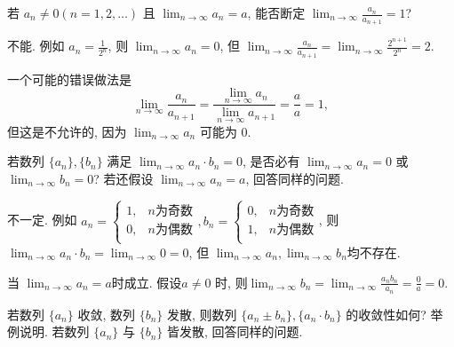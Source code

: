 \begin{exercise}[1.2.9]
    若 $a_n \ne 0 (n=1, 2, \ldots)$ 且 $\lim_{n\to\infty} a_n = a$, 能否断定 $\lim_{n\to\infty} \frac{a_n}{a_{n+1}} = 1$?
\end{exercise}

\begin{solution}
    不能. 例如 $a_n = \frac{1}{2^n}$, 则 $\lim_{n\to\infty} a_n = 0$, 但 $\lim_{n\to\infty} \frac{a_n}{a_{n+1}} = \lim_{n\to\infty} \frac{2^{n+1}}{2^n} = 2$.

    一个可能的错误做法是$$\lim_{n\to\infty} \frac{a_n}{a_{n+1}} = \frac{\lim_{n\to\infty} a_n}{\lim_{n\to\infty} a_{n+1}} = \frac{a}{a} = 1,$$ 但这是不允许的, 因为 $\lim_{n\to\infty} a_n$ 可能为 $0$.
\end{solution}

\begin{exercise}[1.2.10]
    若数列 $\{a_n\}, \{b_n\}$ 满足 $\lim_{n\to\infty} a_n \cdot b_n = 0$, 是否必有 $\lim_{n\to\infty} a_n = 0$ 或 $\lim_{n\to\infty} b_n = 0$?
    若还假设 $\lim_{n\to\infty} a_n = a$, 回答同样的问题.
\end{exercise}

\begin{solution}
    不一定. 例如 $a_n = \begin{cases}
            1, & n\text{为奇数} \\
            0, & n\text{为偶数} \\
        \end{cases}, b_n = \begin{cases}
            0, & n\text{为奇数} \\
            1, & n\text{为偶数} \\
        \end{cases}$, 则 $\lim_{n\to\infty} a_n \cdot b_n = \lim_{n\to\infty} 0=0$, 但 $\lim_{n\to\infty} a_n,\lim_{n\to\infty} b_n$均不存在.

    当 $\lim_{n\to\infty} a_n = a$时成立. 假设$a \ne 0$ 时, 则$\lim_{n\to\infty} b_n = \lim_{n\to\infty} \frac{a_n b_n}{a_n} = \frac{0}{a} = 0$.
\end{solution}

\begin{exercise}[1.2.11]
    若数列 $\{a_n\}$ 收敛, 数列 $\{b_n\}$ 发散, 则数列 $\{a_n \pm b_n\}, \{a_n \cdot b_n\}$ 的收敛性如何? 举例说明. 若数列 $\{a_n\}$ 与 $\{b_n\}$ 皆发散, 回答同样的问题.
\end{exercise}

